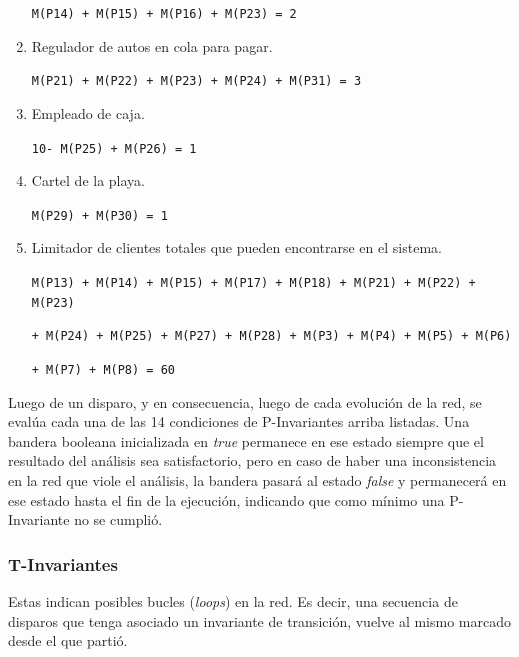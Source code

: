 \documentclass[12pt,a4paper]{article}
\begin{document}
\begin{enumerate}[leftmargin=1.5cm]
        \verb|M(P14) + M(P15) + M(P16) + M(P23) = 2 |

\item Regulador de autos en cola para pagar.

        \verb|M(P21) + M(P22) + M(P23) + M(P24) + M(P31) = 3|
        
\item Empleado de caja.

        \verb|10- M(P25) + M(P26) = 1 |     
        
\item Cartel de la playa.        

        \verb|M(P29) + M(P30) = 1|
        
\item Limitador de clientes totales que pueden encontrarse en el sistema.

        \verb|M(P13) + M(P14) + M(P15) + M(P17) + M(P18) + M(P21) + M(P22) + M(P23) |
        
        \verb|+ M(P24) + M(P25) + M(P27) + M(P28) + M(P3) + M(P4) + M(P5) + M(P6) |
        
        \verb|+ M(P7) + M(P8) = 60|   
\end{enumerate}

Luego de un disparo, y en consecuencia, luego de cada evolución de la red, se evalúa cada una de las 14 condiciones de P-Invariantes arriba listadas. 
Una bandera booleana inicializada en \textit{true} permanece en ese estado siempre que el resultado del análisis sea satisfactorio, pero en caso de haber una inconsistencia en la red que viole el análisis, la bandera pasará al estado \textit{false} y permanecerá en ese estado hasta el fin de la ejecución, indicando que como mínimo una P-Invariante no se cumplió.

\subsubsection{T-Invariantes}
Estas indican posibles bucles (\emph{loops}) en la red. Es decir, una secuencia de disparos que tenga asociado un invariante de transición, vuelve al mismo marcado desde el que partió.
\end{document}

